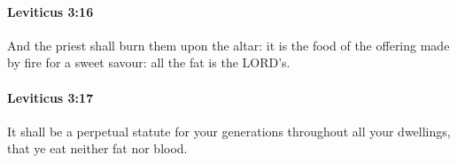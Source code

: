 		\paragraph{Leviticus 3:16} %
			\label{LEVITICUS-3-16}

			And the priest shall burn them upon the altar: it is the food of the offering made by fire for a sweet savour: all the fat is the LORD’s.


		\paragraph{Leviticus 3:17} %
			\label{LEVITICUS-3-17}

			It shall be a perpetual statute for your generations throughout all your dwellings, that ye eat neither fat nor blood.

